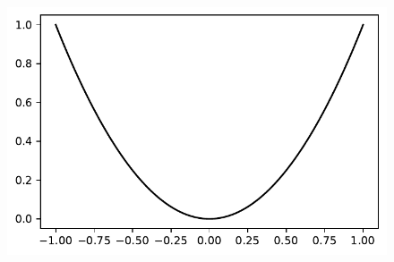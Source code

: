 \documentclass[
  letterpaper,
  DIV=11,
  numbers=noendperiod]{scrreprt}
\begin{document}
\begin{figure}[H]

{\centering \includegraphics{a_04_spot_doc_files/figure-pdf/cell-4-output-1.pdf}

}

\end{figure}
\end{document}
